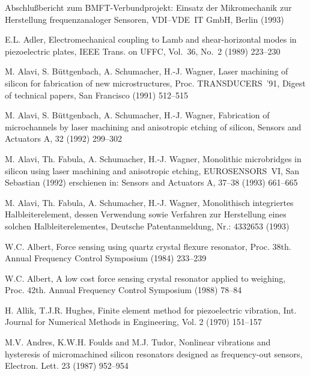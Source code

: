 
\newpage
{}
\begin{thebibliography}{xxx}

 Abschlußbericht zum BMFT-Verbundprojekt: Einsatz der Mikromechanik
 zur Herstellung frequenzanaloger Sensoren, VDI--VDE~IT GmbH, Berlin (1993)

 E.L. Adler, Electromechanical coupling to Lamb and shear-horizontal modes
 in piezoelectric plates, IEEE Trans. on UFFC, Vol.~36, No.~2 (1989) 223--230

 M. Alavi, S. Büttgenbach, A. Schumacher, H.-J. Wagner,
 Laser machining of silicon for fabrication of new microstructures,
 Proc. TRANSDUCERS~'91, Digest of technical papers, San Francisco
 (1991) 512--515

 M. Alavi, S. Büttgenbach, A. Schumacher, H.-J. Wagner,
 Fabrication of microchannels by laser machining and anisotropic etching of
 silicon, Sensors and Actuators A, 32 (1992) 299--302

 M. Alavi, Th. Fabula, A. Schumacher, H.-J. Wagner,
 Monolithic microbridges in silicon using laser machining and anisotropic
 etching, EUROSENSORS~VI, San Sebastian (1992) erschienen in: Sensors and
 Actuators A, 37--38 (1993) 661--665

 M. Alavi, Th. Fabula, A. Schumacher, H.-J. Wagner,
 Monolithisch integriertes Halbleiterelement, dessen Verwendung sowie
 Verfahren zur Herstellung eines solchen Halbleiterelementes,
 Deutsche Patentanmeldung, Nr.: 4332653 (1993)

 W.C. Albert, Force sensing using quartz crystal flexure resonator,
 Proc. 38th. Annual Frequency Control Symposium (1984) 233--239

 W.C. Albert, A low cost force sensing crystal resonator applied to weighing,
 Proc. 42th. Annual Frequency Control Symposium (1988) 78--84

 H. Allik, T.J.R. Hughes, Finite element method for piezoelectric vibration,
 Int. Journal for Numerical Methods in Engineering, Vol. 2 (1970) 151--157

 M.V. Andres, K.W.H. Foulds and M.J. Tudor, Nonlinear vibrations and
 hysteresis of micromachined silicon resonators designed as frequency-out
 sensors, Electron. Lett. 23 (1987) 952--954


\end{thebibliography}
